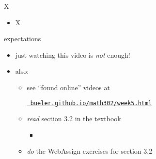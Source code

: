\documentclass{beamer}
\begin{document}
\begin{frame}{X}

\begin{itemize}
\item X
\end{itemize}
\end{frame}


\begin{frame}{expectations}

\begin{itemize}
\item just watching this video is \emph{not} enough!

\item also:
     \begin{itemize}
     \item see ``found online'' videos at

     \centerline{\href{https://bueler.github.io/math302/week5.html}{\tt \color{cyan} bueler.github.io/math302/week5.html}}
     \item \emph{read} section 3.2 in the textbook
         \begin{itemize}
         \item 
         \end{itemize}
     \item \emph{do} the WebAssign exercises for section 3.2
     \end{itemize}
\end{itemize}
\end{frame}
\end{document}

